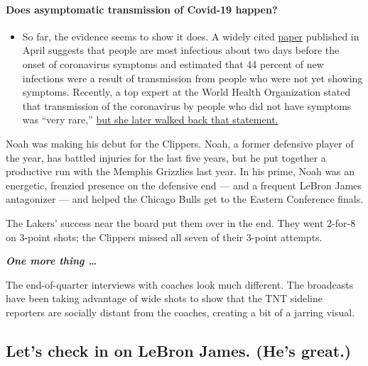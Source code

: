 \begin{itemize}
{  \paragraph{Does asymptomatic transmission of Covid-19
  happen?}\label{does-asymptomatic-transmission-of-covid-19-happen}}

  \begin{itemize}
  \tightlist
  \item
    So far, the evidence seems to show it does. A widely cited
    \href{https://www.nature.com/articles/s41591-020-0869-5}{paper}
    published in April suggests that people are most infectious about
    two days before the onset of coronavirus symptoms and estimated that
    44 percent of new infections were a result of transmission from
    people who were not yet showing symptoms. Recently, a top expert at
    the World Health Organization stated that transmission of the
    coronavirus by people who did not have symptoms was ``very rare,''
    \href{https://www.nytimes.com/2020/06/09/world/coronavirus-updates.html?action=click\&pgtype=Article\&state=default\&region=MAIN_CONTENT_3\&context=storylines_faq\#link-1f302e21}{but
    she later walked back that statement.}
  \end{itemize}
\end{itemize}

Noah was making his debut for the Clippers. Noah, a former defensive
player of the year, has battled injuries for the last five years, but he
put together a productive run with the Memphis Grizzlies last year. In
his prime, Noah was an energetic, frenzied presence on the defensive end
--- and a frequent LeBron James antagonizer --- and helped the Chicago
Bulls get to the Eastern Conference finals.

The Lakers' success near the board put them over in the end. They went
2-for-8 on 3-point shots; the Clippers missed all seven of their 3-point
attempts.

\emph{\textbf{One more thing \ldots{}}}

The end-of-quarter interviews with coaches look much different. The
broadcasts have been taking advantage of wide shots to show that the TNT
sideline reporters are socially distant from the coaches, creating a bit
of a jarring visual.

\hypertarget{lets-check-in-on-lebron-james-hes-great}{%
\subsection{Let's check in on LeBron James. (He's
great.)}\label{lets-check-in-on-lebron-james-hes-great}}

